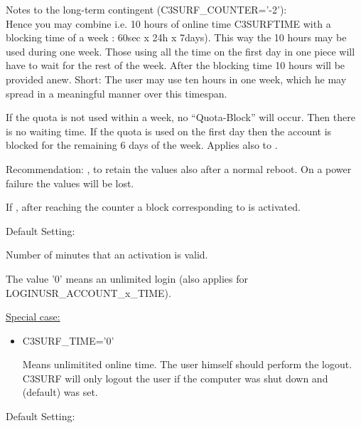 \begin{itemize}
\begin{description}
\begin{itemize}
  \end{itemize}

  Notes to the long-term contingent (C3SURF\_COUNTER='-2'):\\
  Hence you may combine i.e. 10 hours of online time {C3SURFTIME}{} with
  a blocking time of a week  : 60sec x 24h x 7days).
  This way the 10 hours may be used during one week. Those using all the time on the first day in one piece
  will have to wait for the rest of the week. After the blocking time 10 hours will be provided anew.
  Short: The user may use ten hours in one week, which he may spread in a meaningful manner over this timespan.

  If the quota is not used within a week, no ``Quota-Block'' will occur. Then there is no waiting time.
  If the quota is used on the first day then the account is blocked for the remaining 6 days of the week.
  Applies also to .

  Recommendation: , to retain the values also after
  a normal reboot. On a power failure the values will be lost.

  If , after reaching the counter a block
  corresponding to  is activated.


  Default Setting: 

  Number of minutes that an activation is valid.

  The value '0' means an unlimited login (also applies for LOGINUSR\_ACCOUNT\_x\_TIME).

\underline{Special case:}
\begin{itemize}
  \item{C3SURF\_TIME='0'}

  Means unlimitited online time. The user himself should perform the logout.
  C3SURF will only logout the user if the computer was shut down and\\
   (default) was set.
\end{itemize}


  Default Setting: 


\end{description}
\end{itemize}
